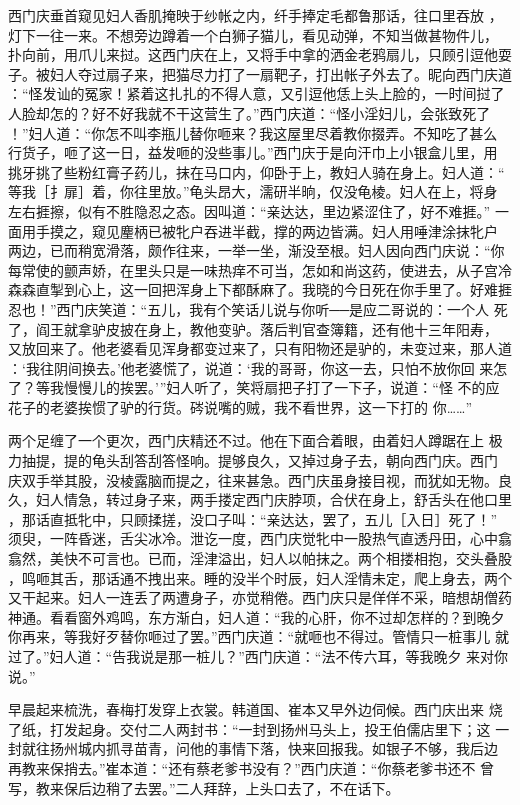 西门庆垂首窥见妇人香肌掩映于纱帐之内，纤手捧定毛都鲁那话，往口里吞放
，灯下一往一来。不想旁边蹲着一个白狮子猫儿，看见动弹，不知当做甚物件儿，
扑向前，用爪儿来挝。这西门庆在上，又将手中拿的洒金老鸦扇儿，只顾引逗他耍
子。被妇人夺过扇子来，把猫尽力打了一扇靶子，打出帐子外去了。昵向西门庆道
：“怪发讪的冤家！紧着这扎扎的不得人意，又引逗他恁上头上脸的，一时间挝了
人脸却怎的？好不好我就不干这营生了。”西门庆道：“怪小淫妇儿，会张致死了
！”妇人道：“你怎不叫李瓶儿替你咂来？我这屋里尽着教你掇弄。不知吃了甚么
行货子，咂了这一日，益发咂的没些事儿。”西门庆于是向汗巾上小银盒儿里，用
挑牙挑了些粉红膏子药儿，抹在马口内，仰卧于上，教妇人骑在身上。妇人道：“
等我［扌扉］着，你往里放。”龟头昂大，濡研半晌，仅没龟棱。妇人在上，将身
左右捱擦，似有不胜隐忍之态。因叫道：“亲达达，里边紧涩住了，好不难捱。”
一面用手摸之，窥见麈柄已被牝户吞进半截，撑的两边皆满。妇人用唾津涂抹牝户
两边，已而稍宽滑落，颇作往来，一举一坐，渐没至根。妇人因向西门庆说：“你
每常使的颤声娇，在里头只是一味热痒不可当，怎如和尚这药，使进去，从子宫冷
森森直掣到心上，这一回把浑身上下都酥麻了。我晓的今日死在你手里了。好难捱
忍也！”西门庆笑道：“五儿，我有个笑话儿说与你听──是应二哥说的：一个人
死了，阎王就拿驴皮披在身上，教他变驴。落后判官查簿籍，还有他十三年阳寿，
又放回来了。他老婆看见浑身都变过来了，只有阳物还是驴的，未变过来，那人道
：‘我往阴间换去。’他老婆慌了，说道：‘我的哥哥，你这一去，只怕不放你回
来怎了？等我慢慢儿的挨罢。’”妇人听了，笑将扇把子打了一下子，说道：“怪
不的应花子的老婆挨惯了驴的行货。硶说嘴的贼，我不看世界，这一下打的
你……”

两个足缠了一个更次，西门庆精还不过。他在下面合着眼，由着妇人蹲踞在上
极力抽提，提的龟头刮答刮答怪响。提够良久，又掉过身子去，朝向西门庆。西门
庆双手举其股，没棱露脑而提之，往来甚急。西门庆虽身接目视，而犹如无物。良
久，妇人情急，转过身子来，两手搂定西门庆脖项，合伏在身上，舒舌头在他口里
，那话直抵牝中，只顾揉搓，没口子叫：“亲达达，罢了，五儿［入日］死了！”
须臾，一阵昏迷，舌尖冰冷。泄讫一度，西门庆觉牝中一股热气直透丹田，心中翕
翕然，美快不可言也。已而，淫津溢出，妇人以帕抹之。两个相搂相抱，交头叠股
，鸣咂其舌，那话通不拽出来。睡的没半个时辰，妇人淫情未定，爬上身去，两个
又干起来。妇人一连丢了两遭身子，亦觉稍倦。西门庆只是佯佯不采，暗想胡僧药
神通。看看窗外鸡鸣，东方渐白，妇人道：“我的心肝，你不过却怎样的？到晚夕
你再来，等我好歹替你咂过了罢。”西门庆道：“就咂也不得过。管情只一桩事儿
就过了。”妇人道：“告我说是那一桩儿？”西门庆道：“法不传六耳，等我晚夕
来对你说。”

早晨起来梳洗，春梅打发穿上衣裳。韩道国、崔本又早外边伺候。西门庆出来
烧了纸，打发起身。交付二人两封书：“一封到扬州马头上，投王伯儒店里下；这
一封就往扬州城内抓寻苗青，问他的事情下落，快来回报我。如银子不够，我后边
再教来保捎去。”崔本道：“还有蔡老爹书没有？”西门庆道：“你蔡老爹书还不
曾写，教来保后边稍了去罢。”二人拜辞，上头口去了，不在话下。

